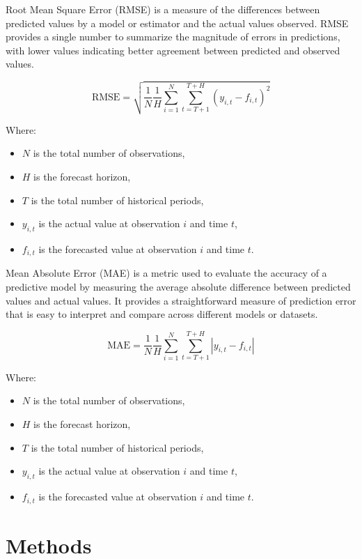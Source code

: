 \documentclass{ieeeojies}
\begin{document}
Root Mean Square Error (RMSE) is a measure of the differences between predicted values by a model or estimator and the actual values observed.  RMSE provides a single number to summarize the magnitude of errors in predictions, with lower values indicating better agreement between predicted and observed values.

\begin{equation}
\text{RMSE} = \sqrt{\frac{1}{N} \frac{1}{H} \sum_{i=1}^{N} \sum_{t=T+1}^{T+H} (y_{i,t} - f_{i,t})^2}
\end{equation}

Where:
\begin{itemize}
    \item \( N \) is the total number of observations,
    \item \( H \) is the forecast horizon,
    \item \( T \) is the total number of historical periods,
    \item \( y_{i,t} \) is the actual value at observation \( i \) and time \( t \),
    \item \( f_{i,t} \) is the forecasted value at observation \( i \) and time \( t \).
\end{itemize}

Mean Absolute Error (MAE) is a metric used to evaluate the accuracy of a predictive model by measuring the average absolute difference between predicted values and actual values. It provides a straightforward measure of prediction error that is easy to interpret and compare across different models or datasets.

\begin{equation}
\text{MAE} = \frac{1}{N} \frac{1}{H} \sum_{i=1}^{N} \sum_{t=T+1}^{T+H} \left| y_{i,t} - f_{i,t} \right|
\end{equation}

Where:
\begin{itemize}
    \item \( N \) is the total number of observations,
    \item \( H \) is the forecast horizon,
    \item \( T \) is the total number of historical periods,
    \item \( y_{i,t} \) is the actual value at observation \( i \) and time \( t \),
    \item \( f_{i,t} \) is the forecasted value at observation \( i \) and time \( t \).
\end{itemize}

\section{Methods}
\end{document}

